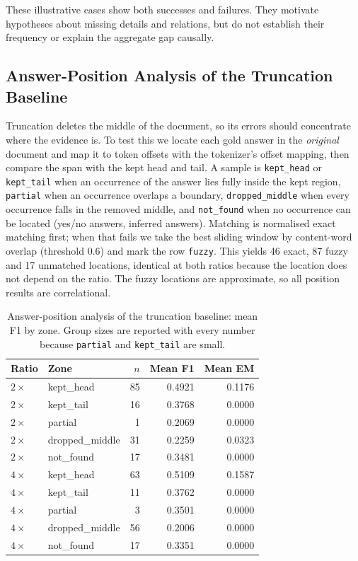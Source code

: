 \documentclass[10pt,a4paper,twocolumn]{article}
\begin{document}
These illustrative cases show both successes and failures. They motivate hypotheses about missing details and relations, but do not establish their frequency or explain the aggregate gap causally.

\subsection{Answer-Position Analysis of the Truncation Baseline}
\label{sec:position}

Truncation deletes the middle of the document, so its errors should concentrate
where the evidence is. To test this we locate each gold answer in the
\emph{original} document and map it to token offsets with the tokenizer's offset
mapping, then compare the span with the kept head and tail. A sample is
\texttt{kept\_head} or \texttt{kept\_tail} when an occurrence of the answer lies
fully inside the kept region, \texttt{partial} when an occurrence overlaps a
boundary, \texttt{dropped\_middle} when every occurrence falls in the removed
middle, and \texttt{not\_found} when no occurrence can be located (yes/no answers,
inferred answers). Matching is normalised exact matching first; when that fails we
take the best sliding window by content-word overlap (threshold 0.6) and mark the
row \texttt{fuzzy}. This yields 46 exact, 87 fuzzy and 17 unmatched locations,
identical at both ratios because the location does not depend on the ratio. The
fuzzy locations are approximate, so all position results are correlational.

\begin{table}[t]
\centering
\footnotesize
\setlength{\tabcolsep}{3.4pt}
\begin{tabular}{@{}llrrr@{}}
\toprule
Ratio & Zone & $n$ & Mean F1 & Mean EM \\
\midrule
$2\times$ & kept\_head      & 85 & 0.4921 & 0.1176 \\
$2\times$ & kept\_tail      & 16 & 0.3768 & 0.0000 \\
$2\times$ & partial         & 1  & 0.2069 & 0.0000 \\
$2\times$ & dropped\_middle & 31 & 0.2259 & 0.0323 \\
$2\times$ & not\_found      & 17 & 0.3481 & 0.0000 \\
\midrule
$4\times$ & kept\_head      & 63 & 0.5109 & 0.1587 \\
$4\times$ & kept\_tail      & 11 & 0.3762 & 0.0000 \\
$4\times$ & partial         & 3  & 0.3501 & 0.0000 \\
$4\times$ & dropped\_middle & 56 & 0.2006 & 0.0000 \\
$4\times$ & not\_found      & 17 & 0.3351 & 0.0000 \\
\bottomrule
\end{tabular}
\caption{Answer-position analysis of the truncation baseline: mean F1 by zone.
Group sizes are reported with every number because \texttt{partial} and
\texttt{kept\_tail} are small.}
\label{tab:zone}
\end{table}
\end{document}
